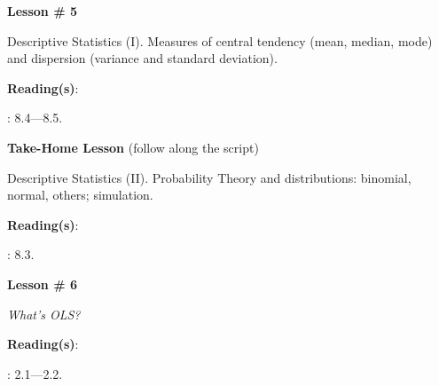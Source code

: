 \documentclass[letterpaper]{article}
\renewenvironment{itemize}{
  \begin{list}{}{
    \setlength{\leftmargin}{1.5em}
  }
}{
  \end{list}
}
\begin{document}
\begin{enumerate}
	\item {}

			\begin{itemize} 
				\item[$\bullet$] {\bf Lesson \# 5} %
					\begin{itemize} 
				\item[$\circ$] Descriptive Statistics (I). Measures of central tendency (mean, median, mode) and dispersion (variance and standard deviation). %
          \item[$\circ$] {\bf Reading(s)}: 
          \begin{itemize}
            \item[$\diamond$] \textcite{Gill:2006wp}: 8.4---8.5.
          \end{itemize}
					\end{itemize}
			\end{itemize}


			\begin{itemize} 
				\item[{\color{red}\Pointinghand}] {\bf Take-Home Lesson} (follow along the script)
					\begin{itemize} 
				\item[$\circ$] Descriptive Statistics (II). Probability Theory and distributions: binomial, normal, others; simulation.  %
         \item[$\circ$] {\bf Reading(s)}: 
          \begin{itemize}
            \item[$\diamond$] \textcite{Gill:2006wp}: 8.3.
          \end{itemize}
					\end{itemize}
			\end{itemize}




	\item {}


			\begin{itemize} 
				\item[$\bullet$] {\bf Lesson \# 6} %
					\begin{itemize} 
						\item[$\circ$] \emph{What's OLS?}
						\item[$\circ$] {\bf Reading(s)}: 
							\begin{itemize}
								\item[$\diamond$] \textcite{Wooldridge2002}: 2.1---2.2.
							\end{itemize}
					\end{itemize}
			\end{itemize}




\end{enumerate}
\end{document}
